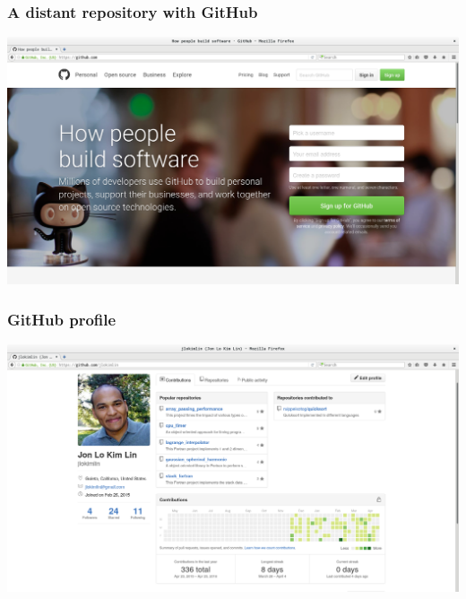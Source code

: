 %
%
\begin{frame}[fragile]
  \frametitle{
    A distant repository with GitHub
  }

  

  \begin{center}
    \includegraphics[scale=0.155]{./graphics/github_homepage.png}
  \end{center}

\end{frame}
%
%
\begin{frame}[fragile]
  \frametitle{
   GitHub profile
  }

  \begin{center}
    \includegraphics[scale=0.155]{./graphics/jlokimlin_github_profile.png}
  \end{center}

\end{frame}
